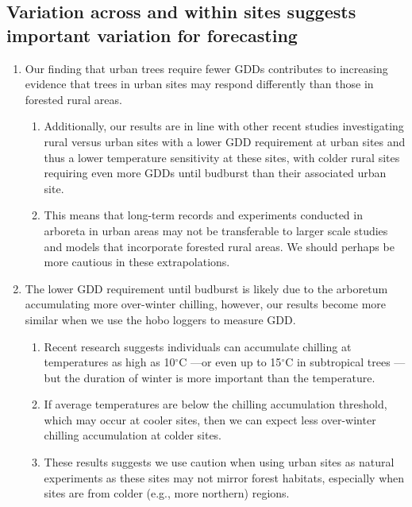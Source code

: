 \documentclass{article}\usepackage[]{graphicx}\usepackage[]{color}
\begin{document}
\subsection*{Variation across and within sites suggests important variation for forecasting} 
  \begin{enumerate} 
\item Our finding that urban trees require fewer GDDs contributes to increasing evidence that trees in urban sites may respond differently than those in forested rural areas.
  \begin{enumerate} 
  \item Additionally, our results are in line with other recent studies investigating rural versus urban sites with a lower GDD requirement at urban sites and thus a lower temperature sensitivity \citep{Meng2020} at these sites, with colder rural sites requiring even more GDDs until budburst than their associated urban site.
  \item This means that long-term records and experiments conducted in arboreta in urban areas may not be transferable to larger scale studies and models that incorporate forested rural areas. We should perhaps be more cautious in these extrapolations. 
  \end{enumerate}
  
\item The lower GDD requirement until budburst is likely due to the arboretum accumulating more over-winter chilling, however, our results become more similar when we use the hobo loggers to measure GDD. 
  \begin{enumerate}
  \item Recent research suggests individuals can accumulate chilling at temperatures as high as 10$^{\circ}$C \citep{Baumgarten2021}---or even up to 15$^{\circ}$C in subtropical trees \citep{Zhang2021}---but the duration of winter is more important than the temperature. 
  \item If average temperatures are below the chilling accumulation threshold, which may occur at cooler sites, then we can expect less over-winter chilling accumulation at colder sites.
  \item These results suggests we use caution when using urban sites as natural experiments as these sites may not mirror forest habitats, especially when sites are from colder (e.g., more northern) regions.
  \end{enumerate}
  

\end{enumerate}
\end{document}
